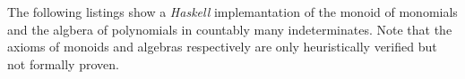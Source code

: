 The following listings show a \emph{Haskell} implemantation of the monoid of
monomials and the algbera of polynomials in countably many indeterminates. Note
that the axioms of monoids and algebras respectively are only heuristically
verified but not formally proven.




